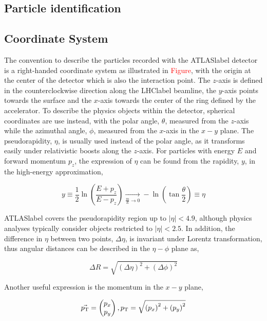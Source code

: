 \subsection{Particle identification}


\subsection{Coordinate System}

The convention to describe the particles recorded with the \acrshort{ATLASlabel} detector is a right-handed coordinate system as illustrated in \textcolor{red}{Figure}, with the origin at the center of the detector which is also the interaction point. The $z$-axis is defined in the counterclockwise direction along the \acrshort{LHClabel} beamline, the $y$-axis points towards the surface and the $x$-axis towards the center of the ring defined by the accelerator. To describe the physics objects within the detector, spherical coordinates are use instead, with the polar angle, $\theta$, measured from the $z$-axis while the azimuthal angle, $\phi$, measured from the $x$-axis in the $x-y$ plane. The pseudorapidity, $\eta$, is usually used instead of the polar angle, as it transforms easily under relativistic boosts along the $z$-axis. For particles with energy $E$ and forward momentum $p_z$, the expression of $\eta$ can be found from the rapidity, $y$, in the high-energy approximation,

\begin{equation}
   y \equiv \frac{1}{2}\ln\left(\frac{E+p_z}{E-p_z}\right) \xrightarrow[ \frac{m}{E} \to 0]{} -\ln\left(\tan\frac{\theta}{2}\right)\equiv \eta
\end{equation}

\acrshort{ATLASlabel} covers the pseudorapidity region up to $|\eta|<4.9$, although physics analyses
typically consider objects restricted to $|\eta|<2.5$. In addition, the difference in $\eta$ between two points, $\Delta\eta$, is invariant under Lorentz transformation, thus angular distances can be described in the $\eta-\phi$ plane as,

\begin{equation}
    \Delta R = \sqrt{\left(\Delta\eta\right)^2+\left(\Delta\phi\right)^2}
\end{equation}

Another useful expression is the momentum in the $x-y$ plane, 

\begin{equation}
    \vec{p_{\text{T}}} = \begin{pmatrix} p_x \\ p_y \end{pmatrix}, p_{\text{T}} = \sqrt{\left(p_x\right)^2+\left(p_y\right)^2}
\end{equation}

